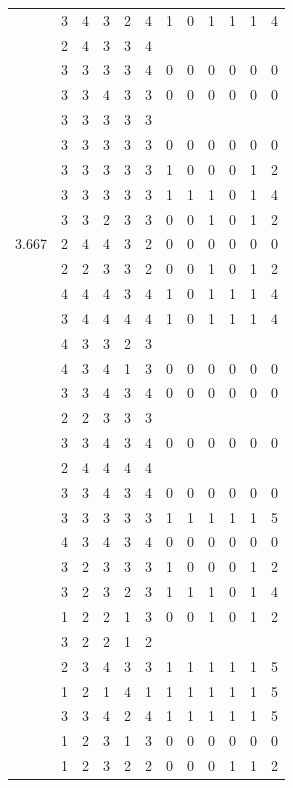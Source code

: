 \documentclass[]{book}
\theoremstyle{definition}
\theoremstyle{definition}
\theoremstyle{definition}
\theoremstyle{remark}
\begin{document}
\begin{table}
{\begin{tabular}[t]{rrrrrrrrrrrr}
 & 3 & 4 & 3 & 2 & 4 & 1 & 0 & 1 & 1 & 1 & 4\\
 & 2 & 4 & 3 & 3 & 4 &  &  &  &  &  & \\
 & 3 & 3 & 3 & 3 & 4 & 0 & 0 & 0 & 0 & 0 & 0\\
 & 3 & 3 & 4 & 3 & 3 & 0 & 0 & 0 & 0 & 0 & 0\\
 & 3 & 3 & 3 & 3 & 3 &  &  &  &  &  & \\
 & 3 & 3 & 3 & 3 & 3 & 0 & 0 & 0 & 0 & 0 & 0\\
 & 3 & 3 & 3 & 3 & 3 & 1 & 0 & 0 & 0 & 1 & 2\\
 & 3 & 3 & 3 & 3 & 3 & 1 & 1 & 1 & 0 & 1 & 4\\
 & 3 & 3 & 2 & 3 & 3 & 0 & 0 & 1 & 0 & 1 & 2\\
3.667 & 2 & 4 & 4 & 3 & 2 & 0 & 0 & 0 & 0 & 0 & 0\\
 & 2 & 2 & 3 & 3 & 2 & 0 & 0 & 1 & 0 & 1 & 2\\
 & 4 & 4 & 4 & 3 & 4 & 1 & 0 & 1 & 1 & 1 & 4\\
 & 3 & 4 & 4 & 4 & 4 & 1 & 0 & 1 & 1 & 1 & 4\\
 & 4 & 3 & 3 & 2 & 3 &  &  &  &  &  & \\
 & 4 & 3 & 4 & 1 & 3 & 0 & 0 & 0 & 0 & 0 & 0\\
 & 3 & 3 & 4 & 3 & 4 & 0 & 0 & 0 & 0 & 0 & 0\\
 & 2 & 2 & 3 & 3 & 3 &  &  &  &  &  & \\
 & 3 & 3 & 4 & 3 & 4 & 0 & 0 & 0 & 0 & 0 & 0\\
 & 2 & 4 & 4 & 4 & 4 &  &  &  &  &  & \\
 & 3 & 3 & 4 & 3 & 4 & 0 & 0 & 0 & 0 & 0 & 0\\
 & 3 & 3 & 3 & 3 & 3 & 1 & 1 & 1 & 1 & 1 & 5\\
 & 4 & 3 & 4 & 3 & 4 & 0 & 0 & 0 & 0 & 0 & 0\\
 & 3 & 2 & 3 & 3 & 3 & 1 & 0 & 0 & 0 & 1 & 2\\
 & 3 & 2 & 3 & 2 & 3 & 1 & 1 & 1 & 0 & 1 & 4\\
 & 1 & 2 & 2 & 1 & 3 & 0 & 0 & 1 & 0 & 1 & 2\\
 & 3 & 2 & 2 & 1 & 2 &  &  &  &  &  & \\
 & 2 & 3 & 4 & 3 & 3 & 1 & 1 & 1 & 1 & 1 & 5\\
 & 1 & 2 & 1 & 4 & 1 & 1 & 1 & 1 & 1 & 1 & 5\\
 & 3 & 3 & 4 & 2 & 4 & 1 & 1 & 1 & 1 & 1 & 5\\
 & 1 & 2 & 3 & 1 & 3 & 0 & 0 & 0 & 0 & 0 & 0\\
 & 1 & 2 & 3 & 2 & 2 & 0 & 0 & 0 & 1 & 1 & 2\\

\end{tabular}}
\end{table}
\end{document}
